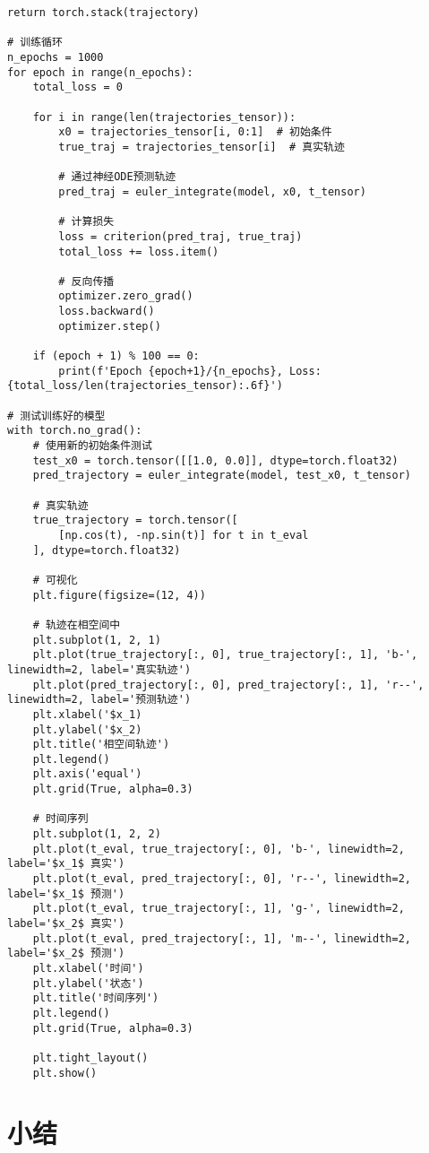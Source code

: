 \begin{lstlisting}[caption={神经ODE学习动力学系统的PyTorch实现}, label=code:neural_ode_example]
    return torch.stack(trajectory)

# 训练循环
n_epochs = 1000
for epoch in range(n_epochs):
    total_loss = 0
    
    for i in range(len(trajectories_tensor)):
        x0 = trajectories_tensor[i, 0:1]  # 初始条件
        true_traj = trajectories_tensor[i]  # 真实轨迹
        
        # 通过神经ODE预测轨迹
        pred_traj = euler_integrate(model, x0, t_tensor)
        
        # 计算损失
        loss = criterion(pred_traj, true_traj)
        total_loss += loss.item()
        
        # 反向传播
        optimizer.zero_grad()
        loss.backward()
        optimizer.step()
    
    if (epoch + 1) % 100 == 0:
        print(f'Epoch {epoch+1}/{n_epochs}, Loss: {total_loss/len(trajectories_tensor):.6f}')

# 测试训练好的模型
with torch.no_grad():
    # 使用新的初始条件测试
    test_x0 = torch.tensor([[1.0, 0.0]], dtype=torch.float32)
    pred_trajectory = euler_integrate(model, test_x0, t_tensor)
    
    # 真实轨迹
    true_trajectory = torch.tensor([
        [np.cos(t), -np.sin(t)] for t in t_eval
    ], dtype=torch.float32)
    
    # 可视化
    plt.figure(figsize=(12, 4))
    
    # 轨迹在相空间中
    plt.subplot(1, 2, 1)
    plt.plot(true_trajectory[:, 0], true_trajectory[:, 1], 'b-', linewidth=2, label='真实轨迹')
    plt.plot(pred_trajectory[:, 0], pred_trajectory[:, 1], 'r--', linewidth=2, label='预测轨迹')
    plt.xlabel('$x_1)
    plt.ylabel('$x_2)
    plt.title('相空间轨迹')
    plt.legend()
    plt.axis('equal')
    plt.grid(True, alpha=0.3)
    
    # 时间序列
    plt.subplot(1, 2, 2)
    plt.plot(t_eval, true_trajectory[:, 0], 'b-', linewidth=2, label='$x_1$ 真实')
    plt.plot(t_eval, pred_trajectory[:, 0], 'r--', linewidth=2, label='$x_1$ 预测')
    plt.plot(t_eval, true_trajectory[:, 1], 'g-', linewidth=2, label='$x_2$ 真实')
    plt.plot(t_eval, pred_trajectory[:, 1], 'm--', linewidth=2, label='$x_2$ 预测')
    plt.xlabel('时间')
    plt.ylabel('状态')
    plt.title('时间序列')
    plt.legend()
    plt.grid(True, alpha=0.3)
    
    plt.tight_layout()
    plt.show()
\end{lstlisting}

\section{小结}
\label{sec:summary}

